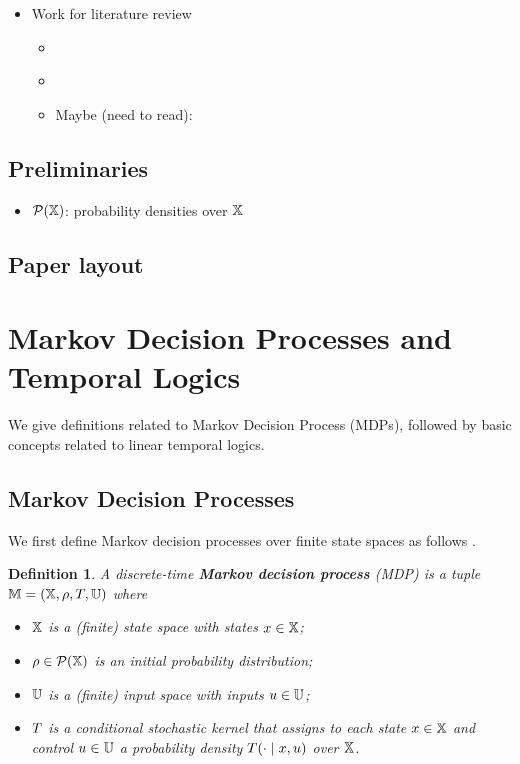 \documentclass[conference]{IEEEtran}
\newtheorem{definition}{Definition}
\begin{document}
\begin{itemize}
  \item Work for literature review
  \begin{itemize}
    \item \cite{Papusha2016}
    \item \cite{Alora2016}
    \item Maybe (need to read): \cite{Lavaei2017}
  \end{itemize}
\end{itemize}

\subsection{Preliminaries}

\begin{itemize}
  \item $\mathcal P(\mathbb{X})$: probability densities over $\mathbb{X}$
\end{itemize}

\subsection{Paper layout}

\section{Markov Decision Processes and Temporal Logics}

We give definitions related to Markov Decision Process (MDPs), followed by basic concepts related to linear temporal logics.

\subsection{Markov Decision Processes}

We first define Markov decision processes over finite state spaces as follows \cite{hll1996}.
\begin{definition}
\label{def:MDP}
  A discrete-time \textbf{Markov decision process} (MDP) is a tuple $\mathbb{M} = (\mathbb{X}, \rho, T, \mathbb{U})$ where
  \begin{itemize}
    \item $\mathbb{X}$ is a (finite) state space with states $x\in\mathbb{X}$; %
    \item $\rho \in \mathcal P(\mathbb{X})$ is an initial probability distribution;
    \item $\mathbb{U}$ is a (finite) input space with inputs $u\in\mathbb{U}$;
    \item $T$ is a conditional stochastic kernel that assigns to each state $x\in \mathbb{X}$ and control $u\in \mathbb{U}$ a probability density $T(\cdot\mid x,u)$ over $\mathbb{X}$.
  \end{itemize}
\end{definition}
\end{document}

